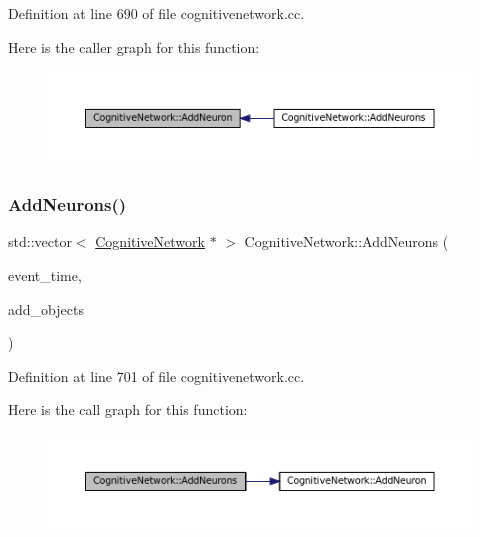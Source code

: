 Definition at line 690 of file cognitivenetwork.\+cc.

Here is the caller graph for this function\+:\nopagebreak
\begin{figure}[H]
\begin{center}
\leavevmode
\includegraphics[width=350pt]{class_cognitive_network_a8457342637fde2d814c54942c3367416_icgraph}
\end{center}
\end{figure}
\mbox{\label{class_cognitive_network_ade928e3355db97d3c5d99501ff4a3b69}} 
\subsubsection{\texorpdfstring{Add\+Neurons()}{AddNeurons()}}
{\footnotesize\ttfamily std\+::vector$<$ \mbox{\hyperlink{class_cognitive_network}{Cognitive\+Network}} $\ast$ $>$ Cognitive\+Network\+::\+Add\+Neurons (\begin{DoxyParamCaption}\item[{std\+::chrono\+::time\+\_\+point$<$ \mbox{\hyperlink{universe_8h_a0ef8d951d1ca5ab3cfaf7ab4c7a6fd80}{Clock}} $>$}]{event\+\_\+time,  }\item[{std\+::vector$<$ \mbox{\hyperlink{class_cognitive_network}{Cognitive\+Network}} $\ast$$>$}]{add\+\_\+objects }\end{DoxyParamCaption})}



Definition at line 701 of file cognitivenetwork.\+cc.

Here is the call graph for this function\+:\nopagebreak
\begin{figure}[H]
\begin{center}
\leavevmode
\includegraphics[width=350pt]{class_cognitive_network_ade928e3355db97d3c5d99501ff4a3b69_cgraph}
\end{center}
\end{figure}
\mbox{\label{class_cognitive_network_ab80ffdc75ad4754463c356d36fb81ab4}} 
